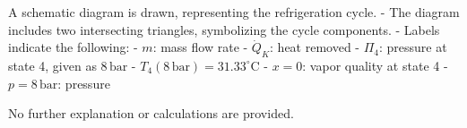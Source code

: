 A schematic diagram is drawn, representing the refrigeration cycle.  
- The diagram includes two intersecting triangles, symbolizing the cycle components.  
- Labels indicate the following:  
  - \( m \): mass flow rate  
  - \( \dot{Q}_K \): heat removed  
  - \( \Pi_4 \): pressure at state 4, given as \( 8 \, \text{bar} \)  
  - \( T_4(8 \, \text{bar}) = 31.33^\circ\text{C} \)  
  - \( x = 0 \): vapor quality at state 4  
  - \( p = 8 \, \text{bar} \): pressure  

No further explanation or calculations are provided.